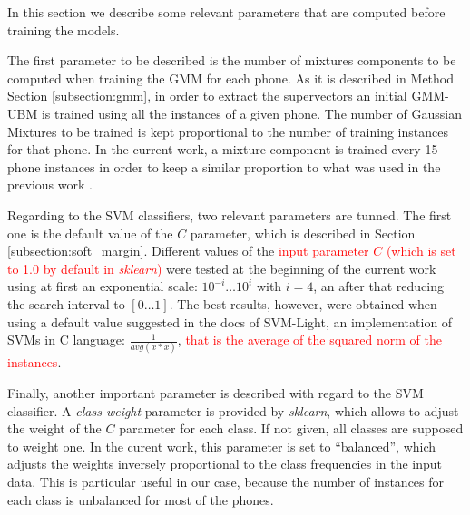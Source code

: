 In this section we describe some relevant parameters that are computed before training the
models.

The first parameter to be described is the number of mixtures components
to be computed when training the GMM for each phone. As it is described in Method Section
\ref{subsection:gmm}, in order to extract the supervectors an initial GMM-UBM is trained
using all the instances of a given phone.
The number of Gaussian Mixtures to be trained is kept proportional to the number of
training instances for that phone. In the current work, a
mixture component is trained every 15 phone instances
in order to keep a similar proportion to what was used in the previous work \cite{main} .

Regarding to the SVM classifiers, two relevant parameters are tunned. The first one is
the default value of the $C$ parameter, which is described in Section
\ref{subsection:soft_margin}.
Different values of the \textcolor{red}{input parameter $C$ (which is set to 1.0 by default
in \textit{sklearn})}
were tested at the beginning of the
current work using at first an exponential scale:
$10^{-i} \ldots 10^{i}$ with $i=4$, an after that reducing the search interval to
$[0 \ldots 1]$. The best results, however, were obtained when using a default value
suggested in the docs of SVM-Light, an implementation of SVMs in C language: $\frac{1}{avg(x*x)}$,
\textcolor{red}{that is the average of the squared norm of the instances}.

Finally, another important parameter is described with regard to the SVM classifier.
A \textit{class-weight} parameter is provided by \textit{sklearn}, which allows to
adjust the weight of the $C$ parameter for each class. If not given, all classes are supposed
to weight one. In the curent work, this parameter is set to ``balanced'', which adjusts
the weights inversely proportional to the class frequencies in the input data.
This is particular useful in our case, because the number of instances for each class is
unbalanced for most of the phones.


